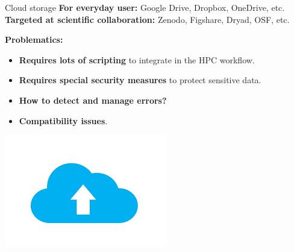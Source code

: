 \begin{frame}{Cloud storage}
  \textbf{For everyday user:} Google Drive, Dropbox, OneDrive, etc.\\
  \textbf{Targeted at scientific collaboration:} Zenodo, Figshare, Dryad, OSF, etc.\\[1ex]
  \begin{minipage}{0.6\textwidth}
    \vspace{0.5cm}
    \textbf{Problematics:}
    \begin{itemize}
      \item \textbf{Requires lots of scripting} to integrate in the HPC workflow.
      \item \textbf{Requires special security measures} to protect sensitive data.
      \item \textbf{How to detect and manage errors?}
      \item \textbf{Compatibility issues}.
    \end{itemize}
  \end{minipage}%
  \hfill
  \begin{minipage}{0.35\textwidth}
    \centering
    \includegraphics[width=\linewidth]{images/cloud-storage.png}
  \end{minipage}
\end{frame}

